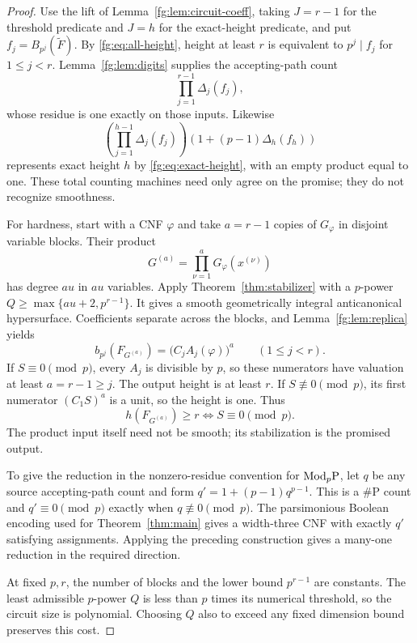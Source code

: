 \begin{proof}
Use the lift of Lemma~\ref{fg:lem:circuit-coeff}, taking $J=r-1$ for the
threshold predicate and $J=h$ for the exact-height predicate, and put
$f_j=B_{p^j}(\widetilde F)$. By \eqref{fg:eq:all-height},
height at least $r$ is equivalent to $p^j\mid f_j$ for $1\le j<r$.
Lemma~\ref{fg:lem:digits} supplies the accepting-path count
\[
 \prod_{j=1}^{r-1}\Delta_j(f_j),
\]
whose residue is one exactly on those inputs. Likewise
\[
 \left(\prod_{j=1}^{h-1}\Delta_j(f_j)\right)
       \left(1+(p-1)\Delta_h(f_h)\right)
\]
represents exact height $h$ by \eqref{fg:eq:exact-height}, with an
empty product equal to one. These total counting machines need only
agree on the promise; they do not recognize smoothness.

For hardness, start with a CNF $\varphi$ and take $a=r-1$ copies of
$G_\varphi$ in disjoint variable blocks. Their product
\[
 G^{(a)}=\prod_{\nu=1}^aG_\varphi(x^{(\nu)})
\]
has degree $au$ in $au$ variables. Apply Theorem~\ref{thm:stabilizer}
with a $p$-power $Q\ge\max\{au+2,p^{r-1}\}$.
It gives a smooth geometrically integral anticanonical hypersurface.
Coefficients separate across the blocks, and
Lemma~\ref{fg:lem:replica} yields
\[
 b_{p^j}(F_{G^{(a)}})=
       \bigl(C_jA_j(\varphi)\bigr)^a\qquad(1\le j<r).
\]
If $S\equiv0\pmod p$, every $A_j$ is divisible by $p$, so these
numerators have valuation at least $a=r-1\ge j$. The output height
is at least $r$. If $S\not\equiv0\pmod p$, its first numerator
$(C_1S)^a$ is a unit, so the height is one. Thus
\[
 h(F_{G^{(a)}})\ge r\iff S\equiv0\pmod p.
\]
The product input itself need not be smooth; its stabilization is the
promised output.

To give the reduction in the nonzero-residue convention for $\mathrm{Mod}_p\mathrm P$,
let $q$ be any source accepting-path count and form
$q'=1+(p-1)q^{p-1}$. This is a $\#\mathrm P$ count and
$q'\equiv0\pmod p$ exactly when $q\not\equiv0\pmod p$.
The parsimonious Boolean encoding used for Theorem~\ref{thm:main}
gives a width-three CNF with exactly $q'$ satisfying assignments.
Applying the preceding construction gives a many-one reduction in
the required direction.

At fixed $p,r$, the number of blocks and the lower bound $p^{r-1}$
are constants. The least admissible $p$-power $Q$ is less than $p$
times its numerical threshold, so the circuit size is polynomial.
Choosing $Q$ also to exceed any fixed dimension bound preserves
this cost.
\end{proof}

